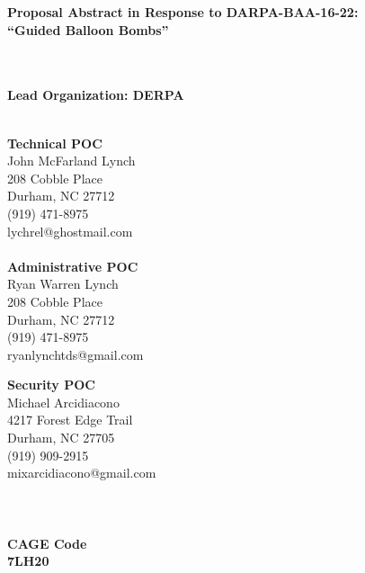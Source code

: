 \documentclass[12pt]{article}
\begin{document}
\begin{center}
\begin{LARGE}
\textbf{Proposal Abstract in Response to DARPA-BAA-16-22:} \\
\textbf{``Guided Balloon Bombs''} \\~\\~\\
\end{LARGE}
\begin{Large}
\textbf{Lead Organization: DERPA} \\~\\
\end{Large}
\end{center}

\begin{multicols}{2}
\begin{Large}
\begin{center}
\textbf{Technical POC} \\
John McFarland Lynch \\
208 Cobble Place \\
Durham, NC 27712 \\
(919) 471-8975 \\
lychrel@ghostmail.com \\~\\

\textbf{Administrative POC} \\
Ryan Warren Lynch \\
208 Cobble Place \\
Durham, NC 27712 \\
(919) 471-8975 \\
ryanlynchtds@gmail.com

\vfill\columnbreak

\textbf{Security POC} \\
Michael Arcidiacono \\
4217 Forest Edge Trail \\
Durham, NC 27705 \\
(919) 909-2915 \\
mixarcidiacono@gmail.com \\~\\~\\~\\

\textbf{CAGE Code} \\
\textbf{7LH20}

\end{center}
\end{Large}
\end{multicols}
\pagebreak
\end{document}
